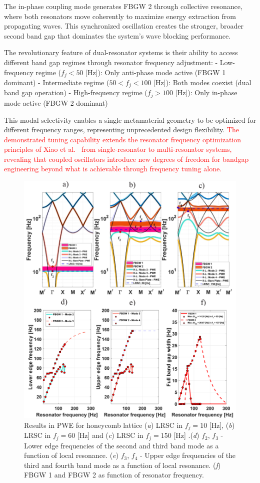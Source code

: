 \documentclass[review,numbers,sort&compress]{elsarticle}
\begin{document}
The in-phase coupling mode generates FBGW 2 through collective resonance, where both resonators move coherently to maximize energy extraction from propagating waves. This synchronized oscillation creates the stronger, broader second band gap that dominates the system's wave blocking performance.

The revolutionary feature of dual-resonator systems is their ability to access different band gap regimes through resonator frequency adjustment:
- Low-frequency regime ($f_j < 50$ [Hz]): Only anti-phase mode active (FBGW 1 dominant)
- Intermediate regime ($50 < f_j < 100$ [Hz]): Both modes coexist (dual band gap operation)
- High-frequency regime ($f_j > 100$ [Hz]): Only in-phase mode active (FBGW 2 dominant)

This modal selectivity enables a single metamaterial geometry to be optimized for different frequency ranges, representing unprecedented design flexibility. \textcolor{red}{The demonstrated tuning capability extends the resonator frequency optimization principles of Xiao et al.~\cite{Xiao_2012} from single-resonator to multi-resonator systems, revealing that coupled oscillators introduce new degrees of freedom for bandgap engineering beyond what is achievable through frequency tuning alone.}
\newpage
\begin{figure}[htb]
	\centering
	\includegraphics[width=.85\textwidth]{2_4_disp_frf_hex.pdf}
	\caption{Results in PWE for honeycomb lattice (\textit{a}) LRSC in $f_j=10$ [Hz], (\textit{b}) LRSC in $f_j=60$ [Hz] and (\textit{c}) LRSC in $f_j=150$ [Hz] .(\textit{d}) $f_2$, $f_3$ - Lower edge frequencies of the second and third band mode as a function of local resonance. (\textit{e}) $f_3$, $f_4$ - Upper edge frequencies of the third and fourth band mode as a function of local resonance. (\textit{f}) FBGW 1 and FBGW 2 as function of resonator frequency. }
	\label{pwe_disp_hex_all_res12}
\end{figure}
\end{document}
